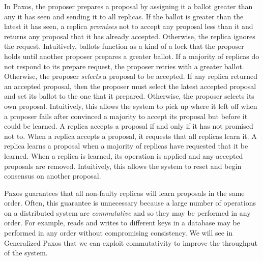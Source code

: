 \documentclass[../main.tex]{subfiles}
\begin{document}
  In Paxos, the proposer prepares a proposal by assigning it a ballot greater than any it has seen
  and sending it to all replicas. If the ballot is greater than the latest it has seen, a replica
  \emph{promises} not to accept any proposal less than it and returns any proposal that it has
  already accepted. Otherwise, the replica ignores the request. Intuitively, ballots function as a
  kind of a lock that the proposer holds until another proposer prepares a greater ballot. If a
  majority of replicas do not respond to its prepare request, the proposer retries with a greater
  ballot. Otherwise, the proposer \emph{selects} a proposal to be accepted. If any replica returned
  an accepted proposal, then the proposer must select the latest accepted proposal and set its
  ballot to the one that it prepared. Otherwise, the proposer selects its own proposal. Intuitively,
  this allows the system to pick up where it left off when a proposer fails after convinced a
  majority to accept its proposal but before it could be learned. A replica accepts a proposal if
  and only if it has not promised not to. When a replica accepts a proposal, it requests that all
  replicas learn it. A replica learns a proposal when a majority of replicas have requested that it
  be learned. When a replica is learned, its operation is applied and any accepted proposals are
  removed. Intuitively, this allows the system to reset and begin consensus on another proposal.

  Paxos guarantees that all non-faulty replicas will learn proposals in the same order. Often, this
  guarantee is unnecessary because a large number of operations on a distributed system are
  \emph{commutative} and so they may be performed in any order. For example, reads and writes to
  different keys in a database may be performed in any order without compromising consistency. We
  will see in Generalized Paxos that we can exploit commutativity to improve the throughput of the
  system.
\end{document}
